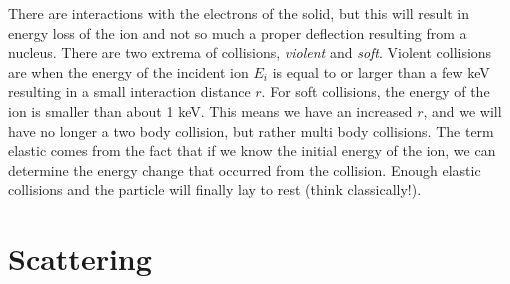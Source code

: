 There are interactions with the electrons of the solid, but this will result in energy loss of the ion and not so much a proper deflection resulting from a nucleus.
There are two extrema of collisions, \textit{violent} and \textit{soft}.
Violent collisions are when the energy of the incident ion $E_i$ is equal to or larger than a few keV resulting in a small interaction distance $r$.
For soft collisions, the energy of the ion is smaller than about 1 keV. This means we have an increased $r$, and we will have no longer a two body collision, but rather multi body collisions.
The term elastic comes from the fact that if we know the initial energy of the ion, we can determine the energy change that occurred from the collision.
Enough elastic collisions and the particle will finally lay to rest (think classically!).


\section{Scattering}\label{sec:scattering}


